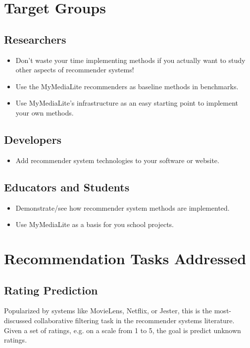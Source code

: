 \documentclass[a4paper, foldmark, 12pt]{leaflet}
\begin{document}
\newpage

\section{Target Groups}

\subsection{Researchers}
\begin{itemize}
	\item Don't waste your time implementing methods
	      if you actually want to study
	      other aspects of recommender systems!
	\item Use the MyMediaLite recommenders as baseline methods in benchmarks.
	\item Use MyMediaLite's infrastructure as an easy
	      starting point to implement your own methods.
\end{itemize}

\subsection{Developers}
\begin{itemize}
	\item Add recommender system technologies to your software or website.
\end{itemize}

\subsection{Educators and Students}
\begin{itemize}
	\item Demonstrate/see how recommender system methods are implemented.
	\item Use MyMediaLite as a basis for you school projects.
\end{itemize}

\newpage

\section{Recommendation Tasks Addressed}

\subsection{Rating Prediction}

Popularized by systems like MovieLens, Netflix, or Jester,
this is the most-discussed collaborative filtering task in the
recommender systems literature.
Given a set of ratings, e.g. on a scale from 1 to 5,
the goal is predict unknown ratings.
\end{document}
